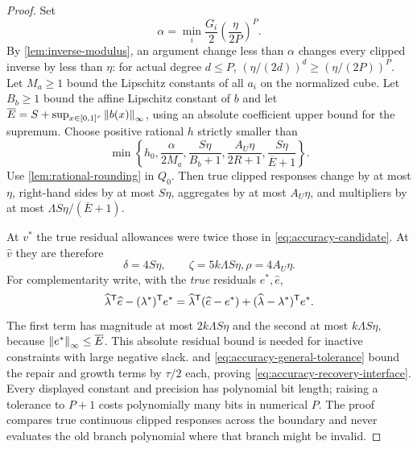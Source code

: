 \begin{proof}
Set
\[
 \alpha=\min_i\frac{G_i}{2}\left(\frac{\eta}{2P}\right)^P.
\]
By \cref{lem:inverse-modulus}, an argument change less than $\alpha$
changes every clipped inverse by less than $\eta$: for actual degree
$d\le P$, $(\eta/(2d))^d\ge(\eta/(2P))^P$.
Let $M_a\ge1$ bound the Lipschitz constants of all $a_i$ on the
normalized cube. Let $B_b\ge1$ bound the affine Lipschitz constant of
$b$ and let $\overline E=S+\sup_{x\in[0,1]^r}\left\lVert b(x)\right\rVert_\infty$,
using an absolute coefficient upper bound for the supremum. Choose
positive rational $h$ strictly smaller than
\begin{equation}\label{eq:accuracy-rounding-distance}
 \min\left\{h_0,\frac{\alpha}{2M_a},
 \frac{S\eta}{B_b+1},\frac{A_U\eta}{2R+1},
                                      \frac{S\eta}{\overline E+1}\right\}.
\end{equation}
Use \cref{lem:rational-rounding} in $Q_0$. Then true clipped responses
change by at most $\eta$, right-hand sides by at most $S\eta$,
aggregates by at most $A_U\eta$, and multipliers by at most
$\Lambda S\eta/(\overline E+1)$.

At $v^*$ the true residual allowances were twice those in
\eqref{eq:accuracy-candidate}. At $\widehat v$ they are therefore
\begin{equation}\label{eq:accuracy-transferred-residuals}
       \delta=4S\eta,\qquad \zeta=5k\Lambda S\eta,
                                      \rho=4A_U\eta.
\end{equation}
For complementarity write, with the \emph{true} residuals $e^*,\widehat e$,
\[
 \widehat\lambda^{\mathsf T}\widehat e-(\lambda^*)^{\mathsf T} e^*
 =\widehat\lambda^{\mathsf T}(\widehat e-e^*)
                         +(\widehat\lambda-\lambda^*)^{\mathsf T} e^*.
\]
The first term has magnitude at most $2k\Lambda S\eta$ and the
second at most $k\Lambda S\eta$, because
$\left\lVert e^*\right\rVert_\infty\le\overline E$. This absolute residual bound
is needed for inactive constraints with large negative slack.
 and
\eqref{eq:accuracy-general-tolerance} bound the repair and growth terms
by $\tau/2$ each, proving \eqref{eq:accuracy-recovery-interface}.
Every displayed constant and precision has polynomial bit length;
raising a tolerance to $P+1$ costs polynomially many bits in numerical
$P$. The proof compares true continuous clipped responses across the
boundary and never evaluates the old branch polynomial where that branch
might be invalid.
\end{proof}

